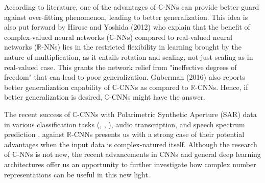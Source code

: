 
According to literature, one of the advantages of $\mathbb{C}$-NNs can provide better guard against over-fitting phenomenon, leading to better generalization. This idea is also put forward by Hirose and Yoshida (2012) \cite{hirose2012complex} who explain that the benefit of complex-valued neural networks ($\mathbb{C}$-NNs) compared to real-valued neural networks ($\mathbb{R}$-NNs) lies in the restricted  flexibility in learning brought by the nature of multiplication, as it entails rotation and scaling, not just scaling as in real-valued case. This grants the network relief from "ineffective degrees of freedom" that can lead to poor generalization. Guberman (2016) \cite{Guberman} also reports better generalization capability of $\mathbb{C}$-CNNs as compared to $\mathbb{R}$-CNNs. Hence, if better generalization is desired, $\mathbb{C}$-CNNs might have the answer.

The recent success of $\mathbb{C}$-CNNs with Polarimetric Synthetic Aperture (SAR) data in various classification tasks (\cite{polsarzhang2017complex}, \cite{hansch2010complex}, \cite{wilmanski2016complex}), audio transcription, and speech spectrum prediction \cite{trabelsi2018deep}, against $\mathbb{R}$-CNNs presents us with a strong case of their potential advantages when the input data is complex-natured itself. Although the research of $\mathbb{C}$-NNs is not new, the recent advancements in CNNs and general deep learning architectures offer us an opportunity to further investigate how complex number representations can be useful in this new light.





